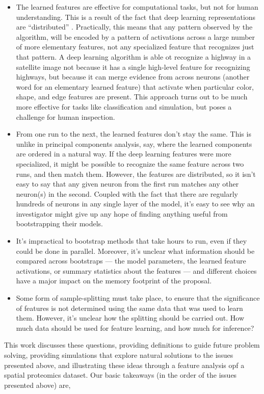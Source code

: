 \begin{itemize}
\item The learned features are effective for computational tasks, but not for human understanding. This is a result of the fact that deep learning representations are ``distributed'' \cite{mcclelland1986parallel}. Practically, this means that any pattern observed by the algorithm, will be encoded by a pattern of activations across a large number of more elementary features, not any specialized feature that recognizes just that pattern. A deep learning algorithm is able ot recognize a highway in a satellite image not because it has a single high-level feature for recognizing highways, but because it can merge evidence from across neurons (another word for an elementary learned feature) that activate when particular color, shape, and edge features are present. This approach turns out to be much more effective for tasks like classification and simulation, but poses a challenge for human inspection.
\item From one run to the next, the learned features don’t stay the same. This is unlike in principal components analysis, say, where the learned components are ordered in a natural way. If the deep learning features were more specialized, it might be possible to recognize the same feature across two runs, and then match them. However, the features are distributed, so it isn’t easy to say that any given neuron from the first run matches any other neuron(s) in the second. Coupled with the fact that there are regularly hundreds of neurons in any single layer of the model, it’s easy to see why an investigator might give up any hope of finding anything useful from bootstrapping their models.
\item It’s impractical to bootstrap methods that take hours to run, even if they could be done in parallel. Moreover, it’s unclear what information should be compared across bootstraps — the model parameters, the learned feature activations, or summary statistics about the features — and different choices have a major impact on the memory footprint of the proposal.
\item Some form of sample-splitting must take place, to ensure that the significance of features is not determined using the same data that was used to learn them. However, it’s unclear how the splitting should be carried out. How much data should be used for feature learning, and how much for inference? 
\end{itemize}

This work discusses these questions, providing definitions to guide future problem solving, providing simulations that explore natural solutions to the issues presented above, and illustrating these ideas through a feature analysis opf a spatial proteomics dataset. Our basic takeaways (in the order of the issues presented above) are,


